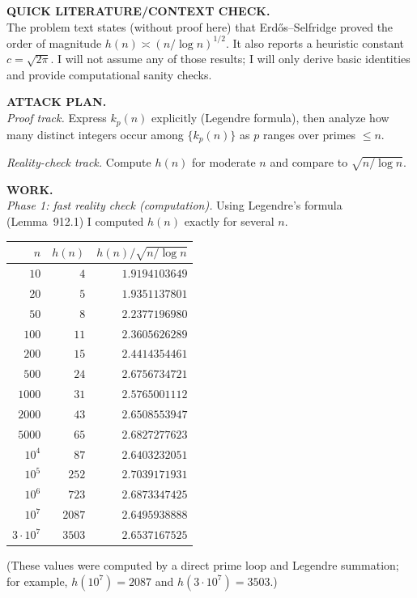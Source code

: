\medskip
\noindent\textbf{QUICK LITERATURE/CONTEXT CHECK.}\\
The problem text states (without proof here) that Erd\H{o}s--Selfridge proved the order of magnitude $h(n)\asymp (n/\log n)^{1/2}$. It also reports a heuristic constant $c=\sqrt{2\pi}$. I will not assume any of those results; I will only derive basic identities and provide computational sanity checks.

\medskip
\noindent\textbf{ATTACK PLAN.}\\
\emph{Proof track.} Express $k_p(n)$ explicitly (Legendre formula), then analyze how many distinct integers occur among $\{k_p(n)\}$ as $p$ ranges over primes $\le n$.

\smallskip
\noindent\emph{Reality-check track.} Compute $h(n)$ for moderate $n$ and compare to $\sqrt{n/\log n}$.

\medskip
\noindent\textbf{WORK.}\\
\emph{Phase 1: fast reality check (computation).}  Using Legendre's formula (Lemma~912.1) I computed $h(n)$ exactly for several $n$.

\begin{center}
\begin{tabular}{r|r|r}
$n$ & $h(n)$ & $h(n)/\sqrt{n/\log n}$\\\hline
$10$ & $4$ & $1.9194103649$\\
$20$ & $5$ & $1.9351137801$\\
$50$ & $8$ & $2.2377196980$\\
$100$ & $11$ & $2.3605626289$\\
$200$ & $15$ & $2.4414354461$\\
$500$ & $24$ & $2.6756734721$\\
$1000$ & $31$ & $2.5765001112$\\
$2000$ & $43$ & $2.6508553947$\\
$5000$ & $65$ & $2.6827277623$\\
$10^4$ & $87$ & $2.6403232051$\\
$10^5$ & $252$ & $2.7039171931$\\
$10^6$ & $723$ & $2.6873347425$\\
$10^7$ & $2087$ & $2.6495938888$\\
$3\cdot 10^7$ & $3503$ & $2.6537167525$\\
\end{tabular}
\end{center}

\noindent (These values were computed by a direct prime loop and Legendre summation; for example, $h(10^7)=2087$ and $h(3\cdot 10^7)=3503$.)

